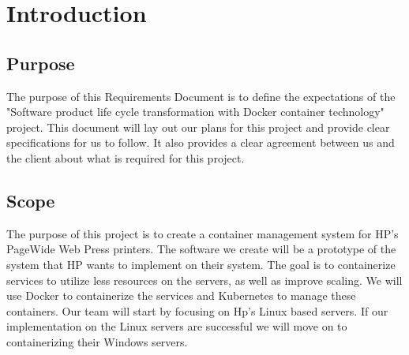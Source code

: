 \documentclass[onecolumn, draftclsnofoot,10pt, compsoc]{IEEEtran}
\begin{document}


\section{Introduction}

\subsection{Purpose}

The purpose of this Requirements Document is to define the expectations of the "Software product life cycle transformation with Docker container technology" project. This document will lay out our plans for this project and provide clear specifications for us to follow. It also provides a clear agreement between us and the client about what is required for this project. 

\subsection{Scope}

The purpose of this project is to create a container management system for HP’s PageWide Web Press printers. The software we create will be a prototype of the system that HP wants to implement on their system. The goal is to containerize services to utilize less resources on the servers, as well as improve scaling. We will use Docker to containerize the services and Kubernetes to manage these containers. Our team will start by focusing on Hp’s Linux based servers. If our implementation on the Linux servers are successful we will move on to containerizing their Windows servers.
	
\end{document}
